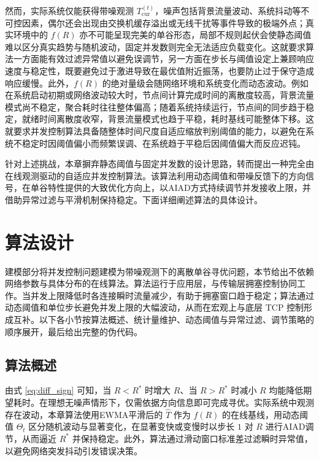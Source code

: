 \documentclass[master, vlined]{DissertUESTC}
\begin{document}
	然而，实际系统仅能获得带噪观测 $T_{\mathrm{cur}}^{(t)}$，噪声包括背景流量波动、系统抖动等不可控因素，偶尔还会出现由交换机缓存溢出或无线干扰等事件导致的极端外点；真实环境中的 $f(R)$ 亦不可能呈现完美的单谷形态，局部不规则起伏会使静态阈值难以区分真实趋势与随机波动，固定并发数则完全无法适应负载变化。这就要求算法一方面能有效过滤异常值以避免误调节，另一方面在步长与阈值设定上兼顾响应速度与稳定性，既要避免过于激进导致在最优值附近振荡，也要防止过于保守造成响应缓慢。此外，$f(R)$ 的绝对量级会随网络环境和系统变化而动态波动。例如在系统启动初期或网络波动较大时，节点间计算完成时间的离散度较高，背景流量模式尚不稳定，聚合耗时往往整体偏高；随着系统持续运行，节点间的同步趋于稳定，就绪时间离散度收窄，背景流量模式也趋于平稳，耗时基线可能整体下移。这就要求并发控制算法具备随整体时间尺度自适应缩放判别阈值的能力，以避免在系统不稳定时因阈值偏小而频繁误调、在系统趋于平稳后因阈值偏大而反应迟钝。

	针对上述挑战，本章摒弃静态阈值与固定并发数的设计思路，转而提出一种完全由在线观测驱动的自适应并发控制算法。该算法利用动态阈值和带噪反馈下的方向信号，在单谷特性提供的大致优化方向上，以AIAD方式持续调节并发接收上限，并借助异常过滤与平滑机制保持稳定。下面详细阐述算法的具体设计。

	\section{算法设计}
	\label{sec:solution}

	建模部分将并发控制问题建模为带噪观测下的离散单谷寻优问题，本节给出不依赖网络参数与具体分布的在线算法。算法运行于应用层，与传输层拥塞控制协同工作。当并发上限降低时各连接瞬时流量减少，有助于拥塞窗口趋于稳定；算法通过动态阈值和单位步长避免并发上限的大幅波动，从而在宏观上与底层 TCP 控制形成互补。以下各小节按算法概述、统计量维护、动态阈值与异常过滤、调节策略的顺序展开，最后给出完整的伪代码。

	\subsection{算法概述}

	由式 \eqref{eq:diff_sign} 可知，当 $R<R^*$ 时增大 $R$、当 $R>R^*$ 时减小 $R$ 均能降低期望耗时。在理想无噪声情形下，仅需依据方向信息即可完成寻优。实际系统中观测存在波动，本章算法使用EWMA平滑后的 $\hat{T}$ 作为 $f(R)$ 的在线基线，用动态阈值 $\Theta_t$ 区分随机波动与显著变化，在显著变快或变慢时以步长 $1$ 对 $R$ 进行AIAD调节，从而逼近 $R^*$ 并保持稳定。此外，算法通过滑动窗口标准差过滤瞬时异常值，以避免网络突发抖动引发错误决策。
\end{document}
